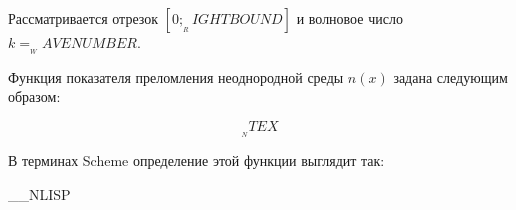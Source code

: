 Рассматривается отрезок $[0; __RIGHTBOUND]$ и волновое число $k=__WAVENUMBER$.

Функция показателя преломления неоднородной среды $n(x)$ задана следующим
образом:

\begin{equation*}
__NTEX
\end{equation*}

В терминах Scheme определение этой функции выглядит так:

__NLISP